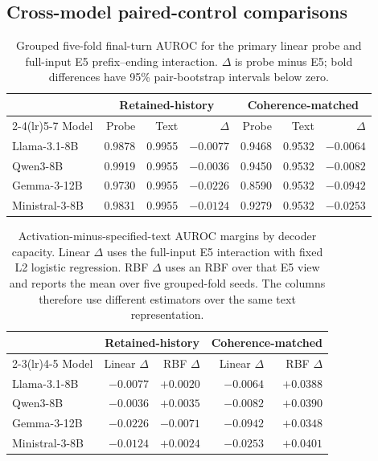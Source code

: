 \documentclass{article}
\begin{document}
\subsection{Cross-model paired-control comparisons}
\label{app:crossmodel}

\begin{table}[h]
  \caption{Grouped five-fold final-turn AUROC for the primary linear probe and
  full-input E5 prefix--ending interaction. $\Delta$ is probe minus E5; bold
  differences have 95\% pair-bootstrap intervals below zero.}
  \label{tab:appendix-crossmodel}
  \centering
  \small
  \begin{tabular}{lrrr@{\qquad}rrr}
    \toprule
      & \multicolumn{3}{c}{Retained-history} & \multicolumn{3}{c}{Coherence-matched} \\
    \cmidrule(lr){2-4}\cmidrule(lr){5-7}
    Model & Probe & Text & $\Delta$ & Probe & Text & $\Delta$ \\
    \midrule
    Llama-3.1-8B & 0.9878 & 0.9955 & $\mathbf{-0.0077}$ & 0.9468 & 0.9532 & $-0.0064$ \\
    Qwen3-8B & 0.9919 & 0.9955 & $-0.0036$ & 0.9450 & 0.9532 & $-0.0082$ \\
    Gemma-3-12B & 0.9730 & 0.9955 & $\mathbf{-0.0226}$ & 0.8590 & 0.9532 & $\mathbf{-0.0942}$ \\
    Ministral-3-8B & 0.9831 & 0.9955 & $\mathbf{-0.0124}$ & 0.9279 & 0.9532 & $\mathbf{-0.0253}$ \\
    \bottomrule
  \end{tabular}
\end{table}

\begin{table}[h]
  \caption{Activation-minus-specified-text AUROC margins by decoder capacity.
  Linear $\Delta$ uses the full-input E5 interaction with fixed L2 logistic
  regression. RBF $\Delta$ uses an RBF over that E5 view and reports the mean
  over five grouped-fold seeds. The columns therefore use different estimators
  over the same text representation.}
  \label{tab:appendix-nonlinear-margins}
  \centering
  \small
  \setlength{\tabcolsep}{7pt}
  \begin{tabular}{lrr@{\qquad}rr}
    \toprule
      & \multicolumn{2}{c}{Retained-history} &
        \multicolumn{2}{c}{Coherence-matched} \\
    \cmidrule(lr){2-3}\cmidrule(lr){4-5}
    Model & Linear $\Delta$ & RBF $\Delta$ & Linear $\Delta$ & RBF $\Delta$ \\
    \midrule
    Llama-3.1-8B & $-0.0077$ & $+0.0020$ & $-0.0064$ & $+0.0388$ \\
    Qwen3-8B & $-0.0036$ & $+0.0035$ & $-0.0082$ & $+0.0390$ \\
    Gemma-3-12B & $-0.0226$ & $-0.0071$ & $-0.0942$ & $+0.0348$ \\
    Ministral-3-8B & $-0.0124$ & $+0.0024$ & $-0.0253$ & $+0.0401$ \\
    \bottomrule
  \end{tabular}
\end{table}
\end{document}
